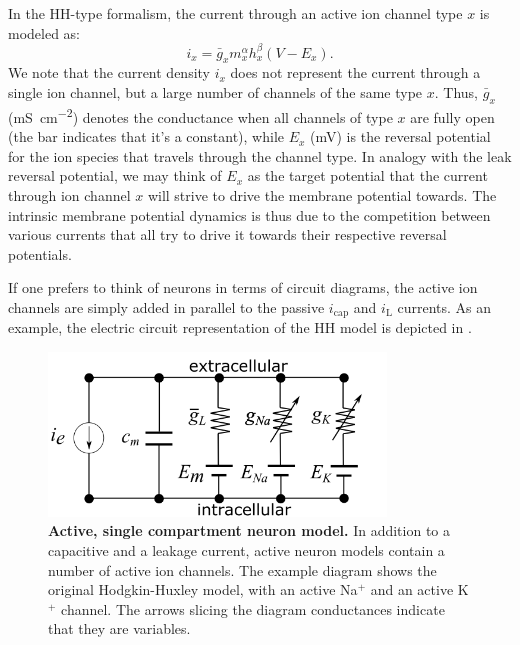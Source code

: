 In the HH-type formalism, the current through an active ion channel type $x$ is modeled as:
\begin{equation}
i_x = \bar{g}_x m_x^{\alpha} h_x^{\beta}(V-E_x).
\label{eq:Neuron:HHform}
\end{equation}
We note that the current density $i_x$ does not represent the current through a single ion channel, but a large number of channels of the same type $x$. Thus, $\bar{g}_x$ (\si{\milli\siemens\per\square\centi\metre}) denotes the conductance when all channels of type $x$ are fully open (the bar indicates that it's a constant), while $E_x$ (\si{\milli\volt}) is the reversal potential for the ion species that travels through the channel type. In analogy with the leak reversal potential, we may think of $E_x$ as the target potential that the current through ion channel $x$ will strive to drive the membrane potential towards. The intrinsic membrane potential dynamics is thus due to the competition between various currents that all try to drive it towards their respective reversal potentials. 

If one prefers to think of neurons in terms of circuit diagrams, the active ion channels are simply added in parallel to the passive $i_{\mathrm{cap}}$ and $i_{\mathrm{L}}$ currents. As an example, the electric circuit representation of the HH model is depicted in .

\begin{figure}[!ht]
\begin{center}
\includegraphics[width=0.8\textwidth]{Figures/Neuron/HHmodel.png}
\end{center}
\caption[]{\textbf{Active, single compartment neuron model.}  In addition to a capacitive and a leakage current, active neuron models contain a number of active ion channels. The example diagram shows the original Hodgkin-Huxley model, with an active Na$^+$ and an active K$^+$ channel. The arrows slicing the diagram conductances indicate that they are variables.}
\label{fig:Neuron:HH}
\end{figure}

